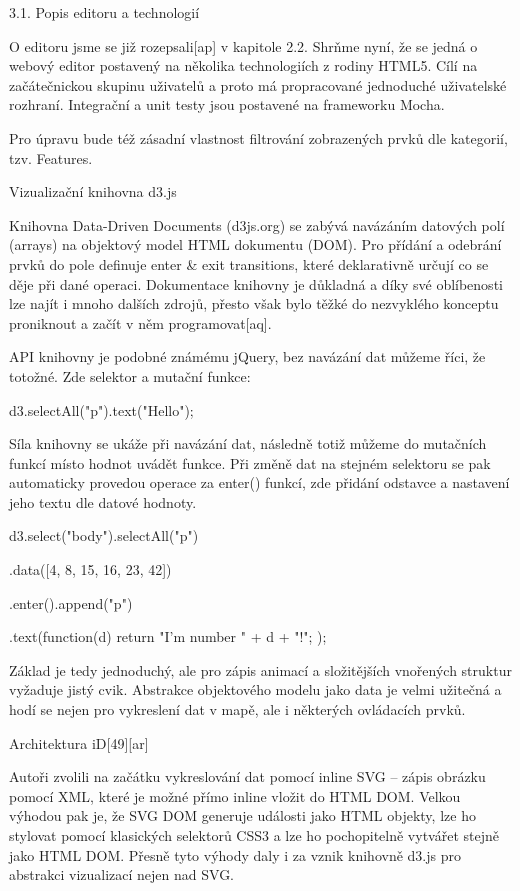3.1. Popis editoru a technologií



O editoru jsme se již rozepsali[ap] v kapitole 2.2. Shrňme nyní, že se jedná o webový editor postavený na několika technologiích z rodiny HTML5. Cílí na začátečnickou skupinu uživatelů a proto má propracované jednoduché uživatelské rozhraní. Integrační a unit testy jsou postavené na frameworku Mocha.

Pro úpravu bude též zásadní vlastnost filtrování zobrazených prvků dle kategorií, tzv. Features.

Vizualizační knihovna d3.js 



Knihovna Data-Driven Documents (d3js.org) se zabývá navázáním datových polí (arrays) na objektový model HTML dokumentu (DOM). Pro přídání a odebrání prvků do pole definuje enter \& exit transitions, které deklarativně určují co se děje při dané operaci. Dokumentace knihovny je důkladná a díky své oblíbenosti lze najít i mnoho dalších zdrojů, přesto však bylo těžké do nezvyklého konceptu proniknout a začít v něm programovat[aq].

API knihovny je podobné známému jQuery, bez navázání dat můžeme říci, že totožné. Zde selektor a mutační funkce:

d3.selectAll("p").text("Hello");

Síla knihovny se ukáže při navázání dat, následně totiž můžeme do mutačních funkcí místo hodnot uvádět funkce. Při změně dat na stejném selektoru se pak automaticky provedou operace za enter() funkcí, zde přidání odstavce a nastavení jeho textu dle datové hodnoty.

d3.select("body").selectAll("p")

   .data([4, 8, 15, 16, 23, 42])

   .enter().append("p")

    .text(function(d) { return "I’m number " + d + "!"; });

Základ je tedy jednoduchý, ale pro zápis animací a složitějších vnořených struktur vyžaduje jistý cvik. Abstrakce objektového modelu jako data je velmi užitečná a hodí se nejen pro vykreslení dat v mapě, ale i některých ovládacích prvků.

Architektura iD[49][ar]



Autoři zvolili na začátku vykreslování dat pomocí inline SVG – zápis obrázku pomocí XML, které je možné přímo inline vložit do HTML DOM. Velkou výhodou pak je, že SVG DOM generuje události jako HTML objekty, lze ho stylovat pomocí klasických selektorů CSS3 a lze ho pochopitelně vytvářet stejně jako HTML DOM. Přesně tyto výhody daly i za vznik knihovně d3.js pro abstrakci vizualizací nejen nad SVG.

